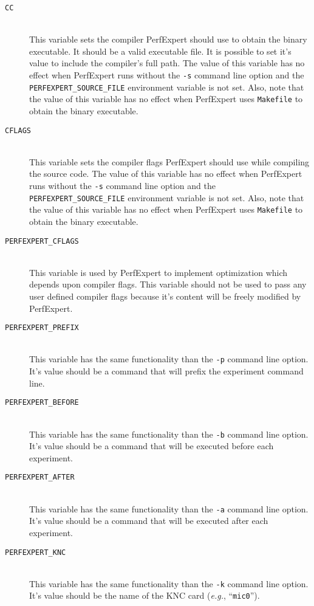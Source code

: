 \begin{description}
	\item[\texttt{CC}]\hfill \\
	This variable sets the compiler PerfExpert should use to obtain the binary executable. It should be a valid executable file. It is possible to set it's value to include the compiler's full path. The value of this variable has no effect when PerfExpert runs without the \texttt{-s} command line option and the \texttt{PERFEXPERT\_SOURCE\_FILE} environment variable is not set. Also, note that the value of this variable has no effect when PerfExpert uses \texttt{Makefile} to obtain the binary executable.

	\item[\texttt{CFLAGS}]\hfill \\
	This variable sets the compiler flags PerfExpert should use while compiling the source code. The value of this variable has no effect when PerfExpert runs without the \texttt{-s} command line option and the \texttt{PERFEXPERT\_SOURCE\_FILE} environment variable is not set. Also, note that the value of this variable has no effect when PerfExpert uses \texttt{Makefile} to obtain the binary executable.

	\item[\texttt{PERFEXPERT\_CFLAGS}]\hfill \\
	This variable is used by PerfExpert to implement optimization which depends upon compiler flags. This variable should not be used to pass any user defined compiler flags because it's content will be freely modified by PerfExpert.

	\item[\texttt{PERFEXPERT\_PREFIX}]\hfill \\
	This variable has the same functionality than the \texttt{-p} command line option. It's value should be a command that will prefix the experiment command line.

	\item[\texttt{PERFEXPERT\_BEFORE}]\hfill \\
	This variable has the same functionality than the \texttt{-b} command line option. It's value should be a command that will be executed before each experiment.

	\item[\texttt{PERFEXPERT\_AFTER}]\hfill \\
	This variable has the same functionality than the \texttt{-a} command line option. It's value should be a command that will be executed after each experiment.

	\item[\texttt{PERFEXPERT\_KNC}]\hfill \\
	This variable has the same functionality than the \texttt{-k} command line option. It's value should be the name of the KNC card (\textit{e.g.}, ``\texttt{mic0}'').


\end{description}
